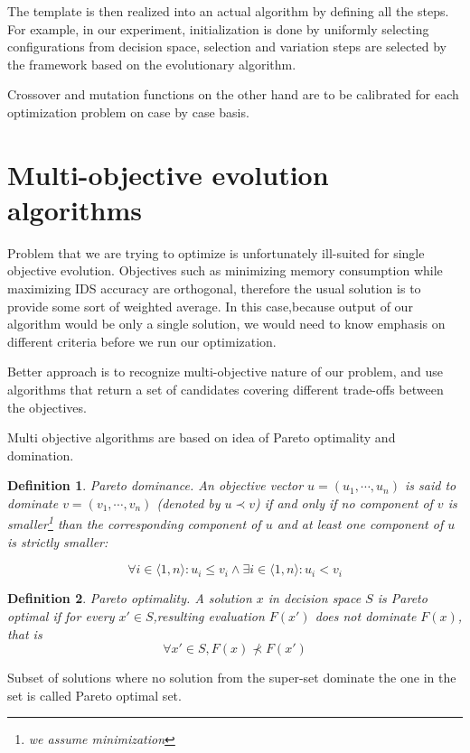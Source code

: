\documentclass[12pt,oneside]{fithesis2}
\newtheorem{defn}{Definition}
\begin{document}
The template is then realized into an actual algorithm by defining all the steps. For example, in our experiment, initialization is done by uniformly selecting configurations from decision space, selection and variation steps are selected by the framework based on the evolutionary algorithm. 

Crossover and mutation functions on the other hand are to be calibrated for each optimization problem on case by case basis.

\section{Multi-objective evolution algorithms}
Problem that we are trying to optimize is unfortunately ill-suited for single objective evolution. Objectives such as minimizing memory consumption while maximizing IDS accuracy are orthogonal, therefore the usual solution is to provide some sort of weighted average. In this case,because output of our algorithm would be only a single solution, we would need to know emphasis on different criteria before we run our optimization. 

Better approach is to recognize multi-objective nature of our problem, and use algorithms that return a set of candidates covering different trade-offs between the objectives. 

Multi objective algorithms are based on idea of Pareto optimality and domination. 

\begin{defn}{Pareto dominance.}
An objective vector $u = (u_1,\cdots,u_n)$ is said to dominate $v = (v_1,\cdots,v_n)$ (denoted by $u \prec v$) if and only if no component of $v$ is smaller\footnote{we assume minimization} than the corresponding component of $u$ and at least one component of $u$ is strictly smaller:

$$ \forall i \in \langle 1,n\rangle: u_i \leq v_i \land \exists i \in \langle 1,n\rangle: u_i < v_i $$
\end{defn}

\begin{defn}{Pareto optimality.}
A solution $x$ in decision space $S$ is Pareto optimal if for every $x' \in S$,resulting evaluation $F(x')$ does not dominate $F(x)$, that is $$ \forall x' \in S, F(x) \not \prec F(x') $$
\end{defn}

Subset of solutions where no solution from the super-set dominate the one in the set is called Pareto optimal set.
\end{document}
